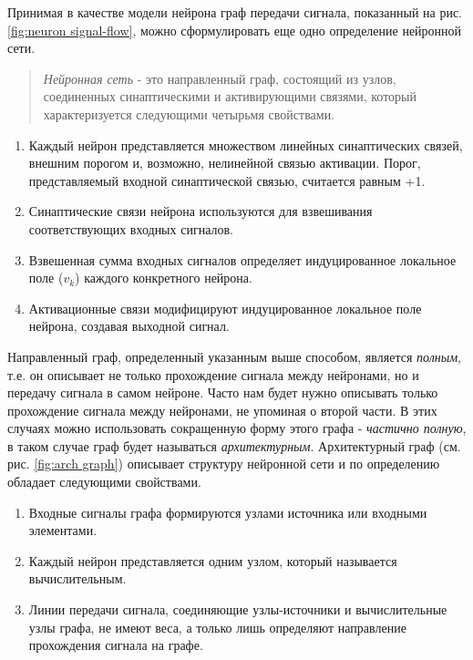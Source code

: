 \documentclass[a4paper,12pt]{report}
\begin{document}
\vspace{1mm}
Принимая в качестве модели нейрона граф передачи сигнала, показанный
на рис. \ref{fig:neuron signal-flow}, можно сформулировать еще одно определение нейронной
сети.
\begin{quote}
    \textit{Нейронная сеть} - это направленный граф, состоящий из
    узлов, соединенных синаптическими и активирующими связями, который
    характеризуется следующими четырьмя свойствами.
\end{quote}

\begin{enumerate}
    \item Каждый нейрон представляется множеством линейных
        синаптических связей, внешним порогом и, возможно,
        нелинейной связью активации. Порог, представляемый входной
        синаптической связью, считается равным +1.
    \item Синаптические связи нейрона используются для взвешивания
        соответствующих входных сигналов.
    \item Взвешенная сумма входных сигналов определяет
        индуцированное локальное поле ($v_k$) каждого конкретного нейрона.
    \item Активационные связи модифицируют индуцированное
        локальное поле нейрона, создавая выходной сигнал.
\end{enumerate}

Направленный граф, определенный указанным выше способом, является
\textit{полным}, т.е. он описывает не только прохождение сигнала между
нейронами, но и передачу сигнала в самом нейроне. Часто нам будет
нужно описывать только прохождение сигнала между нейронами, не
упоминая о второй части. В этих случаях можно использовать сокращенную
форму этого графа - \textit{частично полную}, в таком случае граф
будет называться \textit{архитектурным}. Архитектурный граф (см. рис.
\ref{fig:arch graph}) описывает
структуру нейронной сети  и по определению обладает следующими
свойствами.
\begin{enumerate}
    \item Входные сигналы графа формируются узлами источника или
        входными элементами.
    \item Каждый нейрон представляется одним узлом, который называется
        вычислительным.
    \item Линии передачи сигнала, соединяющие узлы-источники и
        вычислительные узлы графа, не имеют веса, а только лишь
        определяют направление прохождения сигнала на графе.
\end{enumerate}
\end{document}
